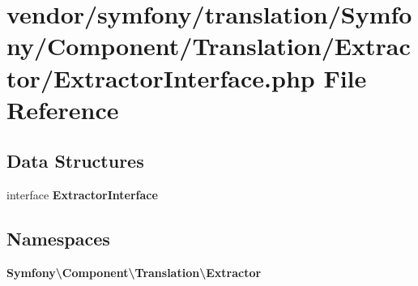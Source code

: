 \section{vendor/symfony/translation/\+Symfony/\+Component/\+Translation/\+Extractor/\+Extractor\+Interface.php File Reference}
\label{_extractor_interface_8php}
\subsection*{Data Structures}
\begin{DoxyCompactItemize}
\item 
interface {\bf Extractor\+Interface}
\end{DoxyCompactItemize}
\subsection*{Namespaces}
\begin{DoxyCompactItemize}
\item 
 {\bf Symfony\textbackslash{}\+Component\textbackslash{}\+Translation\textbackslash{}\+Extractor}
\end{DoxyCompactItemize}
